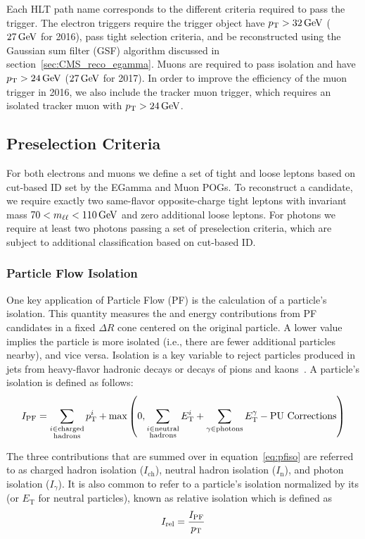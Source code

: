 Each HLT path name corresponds to the different criteria required to pass the trigger. The electron triggers require the trigger object have $p_{\mathrm{T}}>32\,\text{Ge\hspace{-.08em}V}$ ($27\,\text{Ge\hspace{-.08em}V}$ for 2016), pass tight selection criteria, and be reconstructed using the Gaussian sum filter (GSF) algorithm discussed in section~\ref{sec:CMS_reco_egamma}. Muons are required to pass isolation and have $p_{\mathrm{T}}>24\,\text{Ge\hspace{-.08em}V}$ ($27\,\text{Ge\hspace{-.08em}V}$ for 2017). In order to improve the efficiency of the muon trigger in 2016, we also include the tracker muon trigger, which requires an isolated tracker muon with $p_{\mathrm{T}}>24\,\text{Ge\hspace{-.08em}V}$.

\subsection{Preselection Criteria} \label{sec:ana_preselection}
For both electrons and muons we define a set of tight and loose leptons based on cut-based ID set by the EGamma and Muon POGs. To reconstruct a \PZ candidate, we require exactly two same-flavor opposite-charge tight leptons with invariant mass $70<m_{\ell\ell}<110\,\text{Ge\hspace{-.08em}V}$ and zero additional loose leptons. For photons we require at least two photons passing a set of preselection criteria, which are subject to additional classification based on cut-based ID.

\subsubsection{Particle Flow Isolation} \label{sec:ana_isolation}
One key application of Particle Flow (PF) is the calculation of a particle's isolation. This quantity measures the \pt and energy contributions from PF candidates in a fixed $\Delta R$ cone centered on the original particle. A lower value implies the particle is more isolated (i.e., there are fewer additional particles nearby), and vice versa. Isolation is a key variable to reject particles produced in jets from heavy-flavor hadronic decays or decays of pions and kaons~\cite{Sirunyan:PF}. A particle's isolation is defined as follows:
\begin{equation}
	\label{eq:pfiso}
	I_\text{PF} = \sum_{\substack{i\in\text{charged}\\\text{hadrons}}}p_{\mathrm{T}}^i+\text{max}\left(0,\sum_{\substack{i\in\text{neutral}\\\text{hadrons}}}E_{\mathrm{T}}^i+\sum_{\gamma\in\text{photons}}E_{\mathrm{T}}^\gamma-\text{PU Corrections}\right)
\end{equation}

The three contributions that are summed over in equation~\ref{eq:pfiso} are referred to as charged hadron isolation ($I_\text{ch}$), neutral hadron isolation ($I_\text{n}$), and photon isolation ($I_\gamma$). It is also common to refer to a particle's isolation normalized by its \pt (or $E_\mathrm{T}$ for neutral particles), known as relative isolation which is defined as
\begin{equation}
	\label{eq:reliso}
	I_\text{rel}=\frac{I_\text{PF}}{p_{\mathrm{T}}}
\end{equation}

